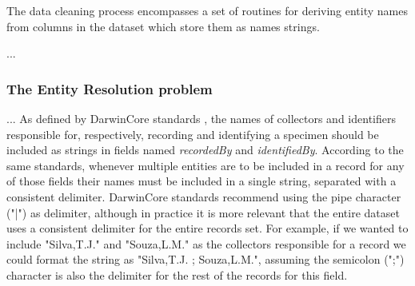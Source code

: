 \documentclass[a4paper]{article}
\begin{document}
The data cleaning process encompasses a set of routines for deriving entity names from columns in the dataset which store them as names strings.

...

\subsubsection{The Entity Resolution problem}
...
As defined by DarwinCore standards \cite{}, the names of collectors and identifiers responsible for, respectively, recording and identifying a specimen should be included as strings in fields named \textit{recordedBy} and \textit{identifiedBy}. According to the same standards, whenever multiple entities are to be included in a record for any of those fields their names must be included in a single string, separated with a consistent delimiter. DarwinCore standards recommend using the pipe character ("|") as delimiter, although in practice it is more relevant that the entire dataset uses a consistent delimiter for the entire records set. For example, if we wanted to include "Silva,T.J." and "Souza,L.M." as the collectors responsible for a record we could format the string as "Silva,T.J. ; Souza,L.M.", assuming the semicolon (";") character is also the delimiter for the rest of the records for this field. 
\end{document}
